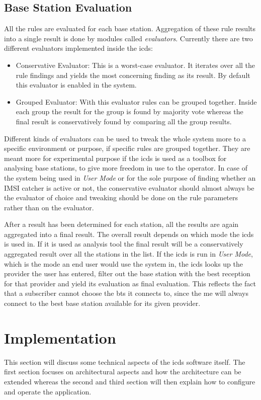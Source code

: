 \subsection{Base Station Evaluation}
\label{sec:evaluators}
All the rules are evaluated for each base station.
Aggregation of these rule results into a single result is done by modules called \emph{evaluators}.
Currently there are two different evaluators implemented inside the \gls{icds}:
\begin{itemize}
	\item Conservative Evaluator: This is a worst-case evaluator.
	It iterates over all the rule findings and yields the most concerning finding as its result.
	By default this evaluator is enabled in the system.
	\item Grouped Evaluator: With this evaluator rules can be grouped together.
	Inside each group the result for the group is found by majority vote whereas the final result is conservatively found by comparing all the group results.
\end{itemize}
Different kinds of evaluators can be used to tweak the whole system more to a specific environment or purpose, if specific rules are grouped together.
They are meant more for experimental purpose if the \gls{icds} is used as a toolbox for analysing base stations, to give more freedom in use to the operator.
In case of the system being used in \emph{User Mode} or for the sole purpose of finding whether an IMSI catcher is active or not, the conservative evaluator should almost always be the evaluator of choice and tweaking should be done on the rule parameters rather than on the evaluator.

After a result has been determined for each station, all the results are again aggregated into a final result.
The overall result depends on which mode the \gls{icds} is used in.
If it is used as analysis tool the final result will be a conservatively aggregated result over all the stations in the list.
If the \gls{icds} is run in \emph{User Mode}, which is the mode an end user would use the system in, the \gls{icds} looks up the provider the user has entered, filter out the base station with the best reception for that provider and yield its evaluation as final evaluation.
This reflects the fact that a subscriber cannot choose the \gls{bts} it connects to, since the \gls{me} will always connect to the best base station available for its given provider.

\section{Implementation}
\label{sec:icds}
This section will discuss some technical aspects of the \gls{icds} software itself.
The first section focuses on architectural aspects and how the architecture can be extended whereas the second and third section will then explain how to configure and operate the application.

